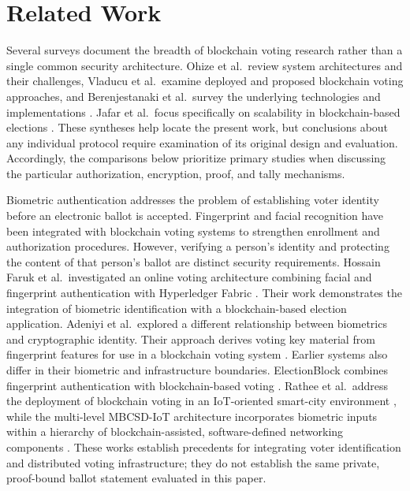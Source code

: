 \section{Related Work}

\label{sec:02}

\label{sec:related-work}

Several surveys document the breadth of blockchain voting research rather than a single common security architecture. Ohize et al.\ review system architectures and their challenges, Vladucu et al.\ examine deployed and proposed blockchain voting approaches, and Berenjestanaki et al.\ survey the underlying technologies and implementations \citep{ohize2025survey,vladucu2023survey,berenjestanaki2024review}. Jafar et al.\ focus specifically on scalability in blockchain-based elections \citep{jafar2022scalability}. These syntheses help locate the present work, but conclusions about any individual protocol require examination of its original design and evaluation. Accordingly, the comparisons below prioritize primary studies when discussing the particular authorization, encryption, proof, and tally mechanisms.

\label{subsec:related-biometric}
Biometric authentication addresses the problem of establishing voter identity before an electronic ballot is accepted. Fingerprint and facial recognition have been integrated with blockchain voting systems to strengthen enrollment and authorization procedures. However, verifying a person's identity and protecting the content of that person's ballot are distinct security requirements. Hossain Faruk et al.\ investigated an online voting architecture combining facial and fingerprint authentication with Hyperledger Fabric \citep{hossainfaruk2024biometric}. Their work demonstrates the integration of biometric identification with a blockchain-based election application. Adeniyi et al.\ explored a different relationship between biometrics and cryptographic identity. Their approach derives voting key material from fingerprint features for use in a blockchain voting system \citep{adeniyi2024biometrickeys}. Earlier systems also differ in their biometric and infrastructure boundaries. ElectionBlock combines fingerprint authentication with blockchain-based voting \citep{ibrahim2021electionblock}. Rathee et al.\ address the deployment of blockchain voting in an IoT-oriented smart-city environment \citep{rathee2021iot}, while the multi-level MBCSD-IoT architecture incorporates biometric inputs within a hierarchy of blockchain-assisted, software-defined networking components \citep{indrason2025mbcsd}. These works establish precedents for integrating voter identification and distributed voting infrastructure; they do not establish the same private, proof-bound ballot statement evaluated in this paper.

